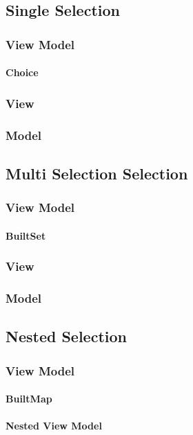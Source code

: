 \documentclass[12pt, twoside]{article}
\begin{document}
\subsection{Single Selection}
\subsubsection{View Model}
\paragraph{Choice}
\subsubsection{View}
\subsubsection{Model}

\subsection{Multi Selection Selection}
\subsubsection{View Model}
\paragraph{BuiltSet}
\subsubsection{View}
\subsubsection{Model}

\subsection{Nested Selection}
\subsubsection{View Model}
\paragraph{BuiltMap}
\paragraph{Nested View Model}
\end{document}
